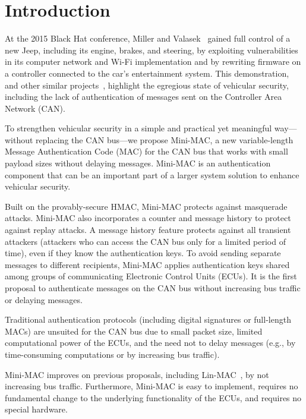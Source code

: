 \section{Introduction}
\label{intro}

At the 2015 Black Hat conference, Miller and Valasek~\cite{blackhat} gained full control of a new Jeep,
including its engine, brakes, and steering, by exploiting vulnerabilities in its
computer network and Wi-Fi implementation and by rewriting firmware on a controller connected to the car's entertainment system.
This demonstration, and other similar 
projects~\cite{Rouf2010,Koscher-2010,Checkoway-2011,Woo-14,C2X}, 
highlight the egregious state of vehicular security, including the lack of 
authentication of messages sent on the Controller Area Network (CAN).   

To strengthen vehicular security in a simple and practical 
yet meaningful way---without replacing the CAN bus---we propose Mini-MAC, 
a new variable-length Message Authentication Code (MAC)
for the CAN bus that works with small payload sizes without delaying messages.  
Mini-MAC is an authentication component that can be an important part of a larger system solution
to enhance vehicular security.

Built on the provably-secure HMAC, Mini-MAC protects against masquerade attacks.  
Mini-MAC also incorporates a counter and message history to protect against replay attacks.
A message history feature protects against all transient attackers (attackers
who can access the CAN bus only for a limited period of time),
even if they know the authentication keys.
To avoid sending separate messages to different recipients, Mini-MAC applies authentication keys
shared among groups of communicating Electronic Control Units (ECUs).
It is the first proposal to authenticate messages on the CAN bus without increasing bus traffic
or delaying messages. 

Traditional authentication protocols (including digital signatures or full-length MACs) are unsuited for the CAN bus due to
small packet size, limited computational power of the ECUs,
and the need not to delay messages (e.g., by time-consuming computations or by
increasing bus traffic).   

Mini-MAC improves on previous proposals, including Lin-MAC~\cite{Lin-MAC}, by not increasing bus traffic.
Furthermore, Mini-MAC is easy to implement,
requires no fundamental change to the underlying functionality of the ECUs, and 
requires no special hardware.

